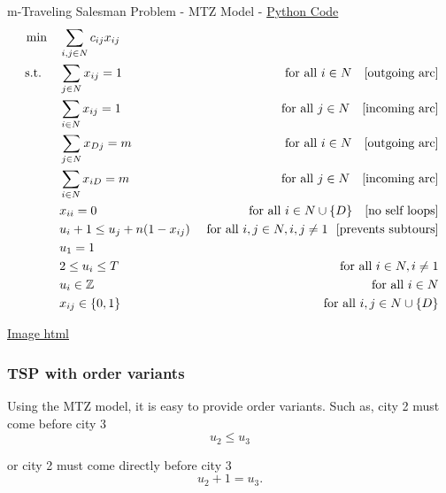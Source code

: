 \begin{general}{m-Traveling Salesman Problem - MTZ Model - }{}
\href{https://github.com/open-optimization/open-optimization-or-examples/blob/master/integer-programming/tsp-mtz/m_TSP_with_MTZ_Model.ipynb}{Python Code}
\begin{align*}
\min \quad & \sum_{i,j \in N} c_{ij} x_{ij}\\
\st \quad  & \sum_{j\in N} x_{ij} = 1 & \text{ for all } i \in N \ \ \text{ [outgoing arc]}\\
& \sum_{i \in N} x_{ij} = 1 & \text{ for all } j \in N \ \ \text{ [incoming arc]}\\
& \sum_{j\in N} x_{Dj} = m & \text{ for all } i \in N \ \ \text{ [outgoing arc]}\\
& \sum_{i \in N} x_{iD} = m & \text{ for all } j \in N \ \ \text{ [incoming arc]}\\
& x_{ii} = 0 & \text{ for all } i \in N\cup\{D\} \ \ \text{ [no self loops]} \\
& u_i + 1 \leq u_j + n(1-x_{ij})  & \text{ for all } i,j \in N, i,j \neq 1 \ \ \text{[prevents subtours]}\\
& u_1 = 1\\
& 2 \leq u_i \leq T & \text{ for all } i \in N, i \neq 1\\
& u_i \in \Z & \text{ for all } i \in N\\
& x_{ij} \in \{0,1\} & \text{ for all } i,j \in N\cup\{D\}
\end{align*}
\end{general}

\par{}\label{fig:m-tsp_solution}%

\href{https://github.com/open-optimization/open-optimization-or-examples/blob/master/integer-programming/tsp-mtz/houses_and_restaurants_assignment.html}{Image html}

\subsubsection{TSP with order variants}
Using the MTZ model, it is easy to provide order variants.  Such as, city 2 must come before city 3
$$
u_2 \leq u_3
$$

or city 2 must come directly before city 3
$$
u_2 + 1 = u_3.
$$


